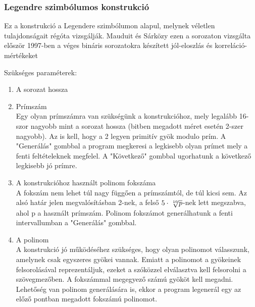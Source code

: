\documentclass[12pt]{article}
\begin{document}
	\subsubsection{Legendre szimbólumos konstrukció}
		Ez a konstrukció a Legendere szimbólumon alapul, melynek véletlen tulajdonságait régóta vizsgálják. Mauduit és Sárközy ezen a sorozaton vizsgálta először 1997-ben a véges bináris sorozatokra készített jól-eloszlás és korreláció-mértékeket \cite{sarkozymauduit}
	\par
	Szükséges paraméterek:
	\begin{enumerate}\bfseries
		\item A sorozat hossza
		\\ 
		\bfseries \item Prímszám
		\\ \normalfont Egy olyan prímszámra van szükségünk a konstrukcióhoz, mely legalább 16-szor nagyobb mint a sorozat hossza (bitben megadott méret esetén 2-szer nagyobb). Az is kell, hogy a 2 legyen primitív gyök modulo prím. A "Generálás" gombbal a program megkeresi a legkisebb olyan prímet mely a fenti feltételeknek megfelel. A "Következő" gombbal ugorhatunk a következő legkisebb jó prímre.
		\bfseries \item A konstrukcióhoz használt polinom fokszáma \\ \normalfont
		A fokszám nem lehet túl nagy függően a prímszámtól, de túl kicsi sem. Az alsó határ jelen megvalósításban 2-nek, a felső $5\cdot\sqrt[\leftroot{-2}\uproot{2}10]{p}$-nek lett megszabva, ahol p a használt prímszám. Polinom fokszámot generálhatunk a fenti intervallumban a "Generálás" gombbal.
		\bfseries \item A polinom \\
		\normalfont
		A konstrukció jó működéséhez szükséges, hogy olyan polinomot válasszunk, amelynek csak egyszeres gyökei vannak. Emiatt a polinomot a gyökeinek felsorolásával reprezentáljuk, ezeket a szóközzel elválasztva kell felsorolni a szövegmezőben. A fokszámmal megegyező számú gyököt kell megadni. Lehetőség van polinom generálására is, ekkor a program legenerál egy az előző pontban megadott fokszámú polinomot.
	\end{enumerate}
	
\end{document}
